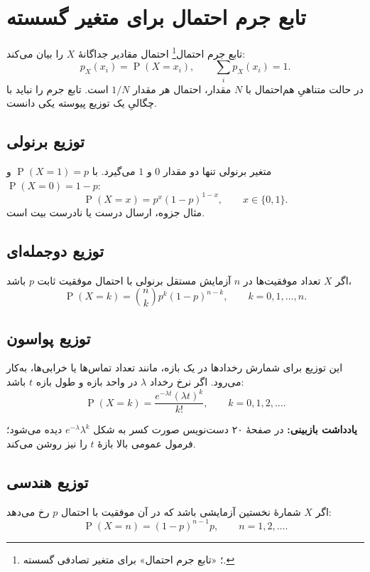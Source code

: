 \documentclass[12pt,a4paper,oneside]{book}
\newcommand{\Prob}{\operatorname{P}}
\newcommand{\NOTE}[1]{\par\smallskip\textbf{یادداشت بازبینی:} #1\par\smallskip}
\begin{document}
\section{تابع جرم احتمال برای متغیر گسسته}
تابع جرم احتمال\footnote{؛ «تابع جرم احتمال» برای متغیر تصادفی گسسته.} احتمال مقادیر جداگانهٔ $X$ را بیان می‌کند:
\[p_X(x_i)=\Prob(X=x_i),\qquad \sum_i p_X(x_i)=1.\]
در حالت متناهیِ هم‌احتمال با $N$ مقدار، احتمال هر مقدار $1/N$ است. تابع جرم را نباید با چگالیِ یک توزیع پیوسته یکی دانست.

\subsection{توزیع برنولی}
متغیر برنولی تنها دو مقدار $0$ و $1$ می‌گیرد. با $\Prob(X=1)=p$ و $\Prob(X=0)=1-p$:
\begin{equation}\Prob(X=x)=p^x(1-p)^{1-x},\qquad x\in\{0,1\}.\end{equation}
مثال جزوه، ارسال درست یا نادرست بیت است.

\subsection{توزیع دوجمله‌ای}
اگر $X$ تعداد موفقیت‌ها در $n$ آزمایش مستقل برنولی با احتمال موفقیت ثابت $p$ باشد،
\begin{equation}\Prob(X=k)=\binom nk p^k(1-p)^{n-k},\qquad k=0,1,\ldots,n.\end{equation}

\subsection{توزیع پواسون}
این توزیع برای شمارش رخدادها در یک بازه، مانند تعداد تماس‌ها یا خرابی‌ها، به‌کار می‌رود. اگر نرخ رخداد $\lambda$ در واحد بازه و طول بازه $t$ باشد:
\begin{equation}\Prob(X=k)=\frac{e^{-\lambda t}(\lambda t)^k}{k!},\qquad k=0,1,2,\ldots.\end{equation}
\NOTE{در صفحهٔ ۲۰ دست‌نویس صورت کسر به شکل $e^{-\lambda}\lambda^k$ دیده می‌شود؛ فرمول عمومی بالا بازهٔ $t$ را نیز روشن می‌کند.}

\subsection{توزیع هندسی}
اگر $X$ شمارهٔ نخستین آزمایشی باشد که در آن موفقیت با احتمال $p$ رخ می‌دهد:
\begin{equation}\Prob(X=n)=(1-p)^{n-1}p,\qquad n=1,2,\ldots.\end{equation}
\end{document}
